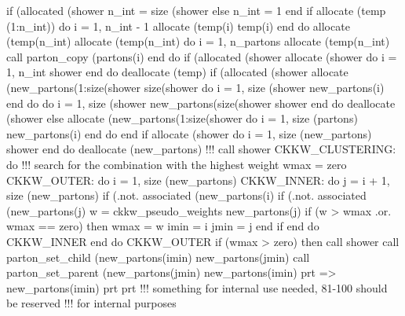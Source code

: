 \eatline
\nwendcode{}\nwdocspar
\nwenddocs{}\endmoddef
if (allocated (shower%
   n_int = size (shower%
else
   n_int = 1
end if
allocate (temp (1:n_int))
do i = 1, n_int - 1
   allocate (temp(i)%
   temp(i)%
end do
allocate (temp(n_int)%
allocate (temp(n_int)%
do i = 1, n_partons
   allocate (temp(n_int)%
   call parton_copy (partons(i)%
end do
if (allocated (shower%
allocate (shower%
do i = 1, n_int
   shower%
end do
deallocate (temp)
\nwendcode{}\nwdocspar
\nwenddocs{}\endmoddef
if (allocated (shower%
   allocate (new_partons(1:size(shower%
        size(shower%
   do i = 1, size (shower%
      new_partons(i)%
   end do
   do i = 1, size (shower%
      new_partons(size(shower%
           shower%
   end do
   deallocate (shower%
else
   allocate (new_partons(1:size(shower%
   do i = 1, size (partons)
      new_partons(i)%
   end do
end if
allocate (shower%
do i = 1, size (new_partons)
   shower%
end do
deallocate (new_partons)
!!! call shower%
\nwendcode{}\nwdocspar
\nwenddocs{}\endmoddef
CKKW_CLUSTERING: do
   !!! search for the combination with the highest weight
   wmax = zero
   CKKW_OUTER: do i = 1, size (new_partons)
      CKKW_INNER: do j = i + 1, size (new_partons)
         if (.not. associated (new_partons(i)%
         if (.not. associated (new_partons(j)%
         w = ckkw_pseudo_weights%
              new_partons(j)%
         if (w > wmax .or. wmax == zero) then
            wmax = w
            imin = i
            jmin = j
         end if
      end do CKKW_INNER
   end do CKKW_OUTER
   if (wmax > zero) then
      call shower%
      call parton_set_child (new_partons(imin)%
           new_partons(jmin)%
      call parton_set_parent (new_partons(jmin)%
           new_partons(imin)%
      prt => new_partons(imin)%
      prt%
      prt%
      !!! something for internal use needed, 81-100 should be reserved
      !!!    for internal purposes

